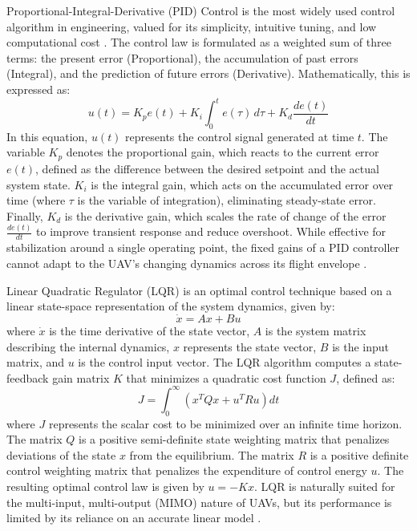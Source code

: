 Proportional-Integral-Derivative (PID) Control is the most widely used control algorithm in engineering, valued for its simplicity, intuitive tuning, and low computational cost  \cite{PID1,PID2}. The control law is formulated as a weighted sum of three terms: the present error (Proportional), the accumulation of past errors (Integral), and the prediction of future errors (Derivative). Mathematically, this is expressed as:
\begin{equation}
    u(t) = K_p e(t) + K_i \int_0^t e(\tau) \,d\tau + K_d \frac{de(t)}{dt}
\end{equation}
In this equation, $u(t)$ represents the control signal generated at time $t$. The variable $K_p$ denotes the proportional gain, which reacts to the current error $e(t)$, defined as the difference between the desired setpoint and the actual system state. $K_i$ is the integral gain, which acts on the accumulated error over time (where $\tau$ is the variable of integration), eliminating steady-state error. Finally, $K_d$ is the derivative gain, which scales the rate of change of the error $\frac{de(t)}{dt}$ to improve transient response and reduce overshoot. While effective for stabilization around a single operating point, the fixed gains of a PID controller cannot adapt to the UAV's changing dynamics across its flight envelope  \cite{PID3}.

Linear Quadratic Regulator (LQR) is an optimal control technique based on a linear state-space representation of the system dynamics, given by:
\begin{equation}
    \dot{x} = Ax + Bu
\end{equation}
where $\dot{x}$ is the time derivative of the state vector, $A$ is the system matrix describing the internal dynamics, $x$ represents the state vector, $B$ is the input matrix, and $u$ is the control input vector. The LQR algorithm computes a state-feedback gain matrix $K$ that minimizes a quadratic cost function $J$, defined as:
\begin{equation}
    J = \int_0^\infty (x^T Q x + u^T R u) dt
\end{equation}
where $J$ represents the scalar cost to be minimized over an infinite time horizon. The matrix $Q$ is a positive semi-definite state weighting matrix that penalizes deviations of the state $x$ from the equilibrium. The matrix $R$ is a positive definite control weighting matrix that penalizes the expenditure of control energy $u$. The resulting optimal control law is given by $u = -Kx$. LQR is naturally suited for the multi-input, multi-output (MIMO) nature of UAVs, but its performance is limited by its reliance on an accurate linear model  \cite{lqr1,lqr2}.

